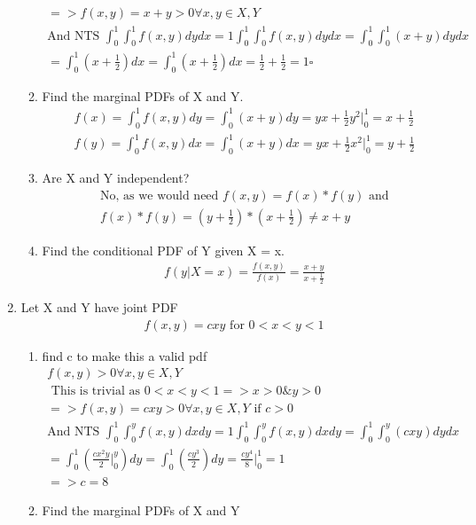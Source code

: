 \documentclass[11pt]{article}
\begin{document}
\begin{enumerate}
\begin{enumerate}
\begin{gather}
		=> f(x,y) = x+y >0 \forall x,y \in X,Y \\
		\text{And NTS } \int_{0}^{1}\int_{0}^{1}f(x,y)dydx = 1
		\int_{0}^{1}\int_{0}^{1}f(x,y)dydx = 	\int_{0}^{1}\int_{0}^{1} (x+ y)dydx \\
		= \int_{0}^{1}(x+\frac{1}{2})dx = \int_{0}^{1}(x+\frac{1}{2})dx = \frac{1}{2} + \frac{1}{2} = 1 \square
	\end{gather}
	\item Find the marginal PDFs of X and Y.
	\begin{gather}
		f(x) = \int_{0}^{1}f(x,y)dy = \int_{0}^{1}(x+ y)dy  = yx + \frac{1}{2}y^2 \big|_0^1 = x+\frac{1}{2}\\
		f(y) = \int_{0}^{1}f(x,y)dx = \int_{0}^{1}(x+ y)dx  = yx + \frac{1}{2}x^2 \big|_0^1 = y+\frac{1}{2}
	\end{gather}
	\item Are X and Y independent?
	\begin{gather}
		\text{No, as we would need }f(x,y) = f(x)*f(y) \text{ and}\\
		f(x)*f(y) = (y+\frac{1}{2}) *  (x+\frac{1}{2}) \ne x+y
	\end{gather}
	\item  Find the conditional PDF of Y given X = x.
	\begin{gather}
		f(y|X=x) = \frac{f(x,y)}{f(x)} = \frac{x+y}{x+\frac{1}{2}}
	\end{gather}
\end{enumerate}
\item Let X and Y have joint PDF
\begin{gather}
	f(x,y) = cxy \text{ for } 0<x<y<1
\end{gather}
\begin{enumerate}
	\item find c to make this a valid pdf
	\begin{gather}
			f(x,y)>0 \forall x,y \in X,Y \\
			\text{ This is trivial as } 0<x<y<1 => x>0 \& y>0 \\
			=> f(x,y) = cxy >0 \forall x,y \in X,Y \text{ if }c>0\\
			\text{And NTS } \int_{0}^{1}\int_{0}^{y}f(x,y)dxdy = 1
			\int_{0}^{1}\int_{0}^{y}f(x,y)dxdy = 	\int_{0}^{1}\int_{0}^{y} (cxy)dydx \\
			= \int_{0}^{1}(\frac{cx^2y}{2}\big|_0^y)dy =\int_{0}^{1}(\frac{cy^3}{2})dy = \frac{cy^4}{8}\big|_0^1 = 1\\
			=> c = 8
	\end{gather}
	\item Find the marginal PDFs of X and Y

\end{enumerate}
\end{enumerate}
\end{document}

